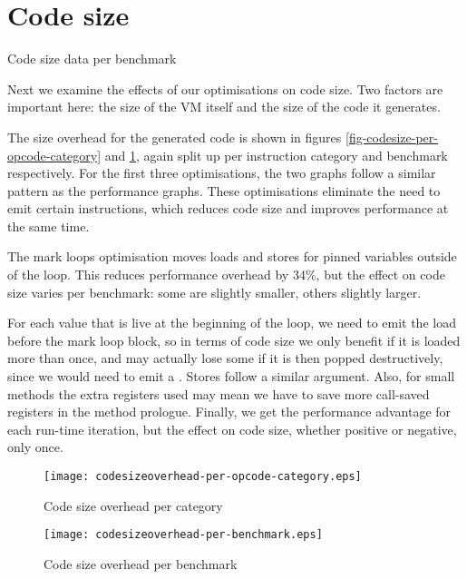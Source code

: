 \section{Code size}
\begin{table}[]
 \centering
 \caption{Code size data per benchmark}
 \label{tbl-codesize-per-benchmark}
 \small
 \scriptsize
 \setlength{\tabcolsep}{4pt}
 
 \setlength{\tabcolsep}{6pt}
\end{table}


Next we examine the effects of our optimisations on code size. Two factors are important here: the size of the VM itself and the size of the code it generates.

The size overhead for the generated code is shown in figures \ref{fig-codesize-per-opcode-category} and \ref{fig-codesize-per-benchmark}, again split up per instruction category and benchmark respectively. For the first three optimisations, the two graphs follow a similar pattern as the performance graphs. These optimisations eliminate the need to emit certain instructions, which reduces code size and improves performance at the same time.

The mark loops optimisation moves loads and stores for pinned variables outside of the loop. This reduces performance overhead by 34\%, but the effect on code size varies per benchmark: some are slightly smaller, others slightly larger.

For each value that is live at the beginning of the loop, we need to emit the load before the mark loop block, so in terms of code size we only benefit if it is loaded more than once, and may actually lose some if it is then popped destructively, since we would need to emit a . Stores follow a similar argument. Also, for small methods the extra registers used may mean we have to save more call-saved registers in the method prologue. Finally, we get the performance advantage for each run-time iteration, but the effect on code size, whether positive or negative, only once.

\begin{figure}
 \centering
 \begin{minipage}{0.45\textwidth}
  \centering
  \texttt{[image: codesizeoverhead-per-opcode-category.eps]}
  \caption{Code size overhead per category}
  \label{fig-codesize-per-opcode-category}
 \end{minipage}\hfill
 \begin{minipage}{0.45\textwidth}
  \centering
  \texttt{[image: codesizeoverhead-per-benchmark.eps]}
  \caption{Code size overhead per benchmark}
  \label{fig-codesize-per-benchmark}
 \end{minipage}
\end{figure}

